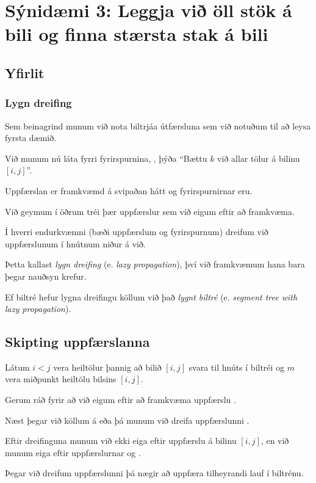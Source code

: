 \section{Sýnidæmi 3: Leggja við öll stök á bili og finna stærsta stak á bili}
\subsection{Yfirlit}
{
    \frametitle{Lygn dreifing}
    {
        \item<1-> Sem beinagrind munum við nota biltrjáa útfærsluna sem við notuðum til að leysa fyrsta dæmið.
        \item<2-> Við munum nú láta fyrri fyrirspurnina, , þýða ``Bættu $k$ við allar tölur á bilinu $[i, j]$''.
        \item<3-> Uppfærslan er framkvæmd á svipaðan hátt og fyrirspurnirnar eru.
        \item<4-> Við geymum í öðrum tréi þær uppfærslur sem við eigum eftir að framkvæma.
        \item<5-> Í hverri endurkvæmni (bæði uppfærslum og fyrirspurnum) dreifum við uppfærslunum í hnútnum niður á við.
        \item<6-> Þetta kallast \emph{lygn dreifing} (e. \emph{lazy propagation}), því við framkvæmum hana bara þegar nauðsyn krefur.
        \item<7-> Ef biltré hefur lygna dreifingu köllum við það \emph{lygnt biltré} (e. \emph{segment tree with lazy propagation}).
    }
}

\subsection{Skipting uppfærslanna}
{
    {
        \item<1-> Látum $i < j$ vera heiltölur þannig að bilið $[i, j]$ svara til hnúts í biltréi og $m$ vera miðpunkt heiltölu bilsins $[i, j]$.
        \item<2-> Gerum ráð fyrir að við eigum eftir að framkvæma uppfærslu .
        \item<3-> Næst þegar við köllum á  eða 
                    þá munum við dreifa uppfærslunni .
        \item<4-> Eftir dreifinguna munum við ekki eiga eftir uppfærslu á bilinu $[i, j]$, en við munum eiga eftir uppfærslurnar
                     og .
        \item<5-> Þegar við dreifum uppfærslunni  þá nægir að uppfæra tilheyrandi lauf í biltrénu.
    }
}

